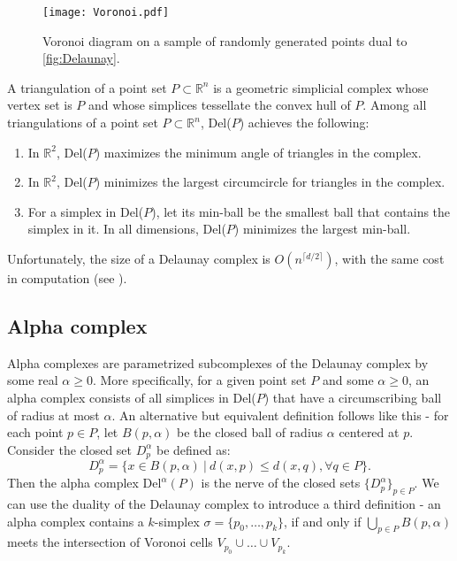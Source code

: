 \begin{figure}[h!]
  \centering
  \texttt{[image: Voronoi.pdf]}
  \caption{Voronoi diagram on a sample of randomly generated points dual to \ref{fig:Delaunay}.}
  \label{fig:Voronoi}
\end{figure}

\begin{theorem}
  A triangulation of a point set $P \subset \mathbb{R}^{n}$ is a geometric simplicial complex whose vertex set is $P$ and whose simplices tessellate the convex hull of $P$. Among all triangulations of a point set $P \subset \mathbb{R}^{n}$, Del($P$) achieves the following:
  \begin{enumerate}
    \item In $\mathbb{R}^{2}$, Del($P$) maximizes the minimum angle of triangles in the complex.
    \item In $\mathbb{R}^{2}$, Del($P$) minimizes the largest circumcircle for triangles in the complex.
    \item For a simplex in Del($P$), let its min-ball be the smallest ball that contains the simplex in it. In all dimensions, Del($P$) minimizes the largest min-ball.
  \end{enumerate}
\end{theorem}
Unfortunately, the size of a Delaunay complex is $O(n^{\lceil d/2 \rceil})$, with the same cost in computation (see \cite{chazelle1993optimal}).

\subsection{Alpha complex}
Alpha complexes are parametrized subcomplexes of the Delaunay complex by some real $\alpha \geq 0$. More specifically, for a given point set $P$ and some $\alpha \geq 0$, an alpha complex consists of all simplices in Del($P$) that have a circumscribing ball of radius at most $\alpha$. An alternative but equivalent definition follows like this - for each point $p \in P$, let $B(p,\alpha)$ be the closed ball of radius $\alpha$ centered at $p$. Consider the closed set $D^{\alpha}_{p}$ be defined as:
\begin{equation*}
  D^{\alpha}_{p} = \{x \in B(p,\alpha) \: \vert \: d(x,p) \leq d(x,q), \forall q \in P\}.
\end{equation*}
Then the alpha complex $\text{Del}^{\alpha}(P)$ is the nerve of the closed sets $\{D^{\alpha}_{p}\}_{p \in P}$.
We can use the duality of the Delaunay complex to introduce a third definition - an alpha complex contains a $k$-simplex $\sigma = \{p_{0}, \ldots, p_{k}\}$, if and only if $\bigcup_{p \in P}B(p,\alpha)$ meets the intersection of Voronoi cells $V_{p_{0}} \cup \ldots \cup V_{p_{k}}$.

